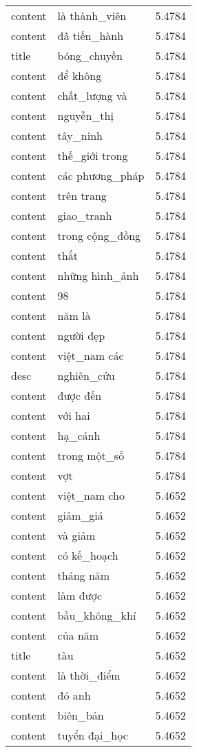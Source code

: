 \documentclass{article}
\begin{document}
\begin{tabular}{lll}
content & là thành\_viên & 5.4784\\
content & đã tiến\_hành & 5.4784\\
title & bóng\_chuyền & 5.4784\\
content & để không & 5.4784\\
content & chất\_lượng và & 5.4784\\
content & nguyễn\_thị & 5.4784\\
content & tây\_ninh & 5.4784\\
content & thế\_giới trong & 5.4784\\
content & các phương\_pháp & 5.4784\\
content & trên trang & 5.4784\\
content & giao\_tranh & 5.4784\\
content & trong cộng\_đồng & 5.4784\\
content & thắt & 5.4784\\
content & những hình\_ảnh & 5.4784\\
content & 98 & 5.4784\\
content & năm là & 5.4784\\
content & người đẹp & 5.4784\\
content & việt\_nam các & 5.4784\\
desc & nghiên\_cứu & 5.4784\\
content & được đến & 5.4784\\
content & với hai & 5.4784\\
content & hạ\_cánh & 5.4784\\
content & trong một\_số & 5.4784\\
content & vợt & 5.4784\\
content & việt\_nam cho & 5.4652\\
content & giảm\_giá & 5.4652\\
content & và giảm & 5.4652\\
content & có kế\_hoạch & 5.4652\\
content & tháng năm & 5.4652\\
content & làm được & 5.4652\\
content & bầu\_không\_khí & 5.4652\\
content & của năm & 5.4652\\
title & tàu & 5.4652\\
content & là thời\_điểm & 5.4652\\
content & đó anh & 5.4652\\
content & biên\_bản & 5.4652\\
content & tuyển đại\_học & 5.4652\\

\end{tabular}
\end{document}
